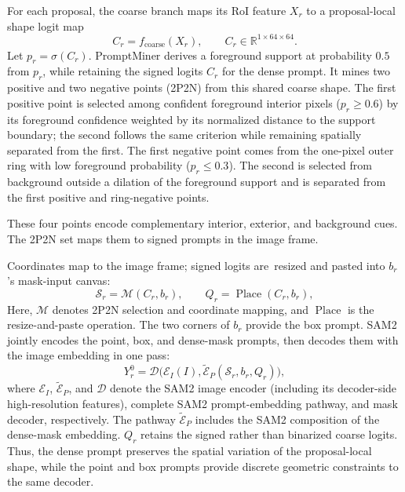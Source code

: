 \documentclass{article}
\begin{document}
\indent For each proposal, the coarse branch maps its RoI feature $X_r$ to a
proposal-local shape logit map
\begin{equation}
C_r=f_{\mathrm{coarse}}(X_r),\qquad C_r\in\mathbb{R}^{1\times64\times64}.
\label{eq:coarse}
\end{equation}
\indent Let $p_r=\sigma(C_r)$. PromptMiner derives a foreground support at probability
$0.5$ from $p_r$, while retaining the signed logits $C_r$ for the dense prompt.
It mines two positive and two negative points (2P2N) from this shared coarse
shape. The first positive point is selected among confident foreground interior
pixels ($p_r\geq0.6$) by its foreground confidence weighted by its normalized
distance to the support boundary; the second follows the same criterion while
remaining spatially separated from the first. The first negative point comes
from the one-pixel outer ring with low foreground probability ($p_r\leq0.3$).
The second is selected from background outside a dilation of the foreground
support and is separated from the first positive and ring-negative points.

\indent These four points encode complementary interior, exterior, and background
cues. The 2P2N set maps them to signed prompts in the image frame.

\indent Coordinates map to the image frame; signed logits are~resized and pasted into
$b_r$'s mask-input canvas:
\begin{equation}
\mathcal{S}_r=\mathcal{M}(C_r,b_r),\qquad
Q_r=\operatorname{Place}(C_r,b_r),
\label{eq:prompt-mining}
\end{equation}
\indent Here, $\mathcal{M}$ denotes 2P2N selection and coordinate mapping, and
$\operatorname{Place}$ is the resize-and-paste operation. The two corners of
$b_r$ provide the box prompt. SAM2 jointly encodes the point, box, and
dense-mask prompts, then decodes them with the image embedding in one pass:
\begin{equation}
Y_r^0=\mathcal{D}\bigl(\mathcal{E}_I(I),
\widetilde{\mathcal{E}}_P(\mathcal{S}_r,b_r,Q_r)\bigr),
\label{eq:native-decoding}
\end{equation}
\indent where $\mathcal{E}_I$, $\widetilde{\mathcal{E}}_P$, and $\mathcal{D}$ denote
the SAM2 image encoder (including its decoder-side high-resolution features),
complete SAM2 prompt-embedding pathway, and mask decoder, respectively.
The pathway $\widetilde{\mathcal{E}}_P$ includes the SAM2 composition of
the dense-mask embedding. $Q_r$ retains the signed rather than binarized
coarse logits. Thus, the dense prompt preserves the spatial variation of the
proposal-local shape, while the point and box prompts provide discrete
geometric constraints to the same decoder.
\end{document}
